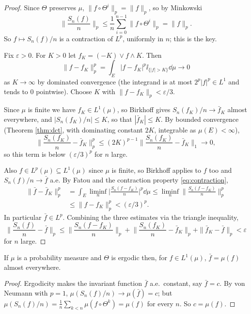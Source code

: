 \documentclass[a4paper]{scrartcl}
\newcommand{\ind}{\ii}
\begin{document}
\begin{proof}
	Since $\Theta$ preserves $\mu$, $\|f\circ\Theta^i\|_p = \|f\|_p$, so by Minkowski
	\begin{equation}\label{eq:contraction}
		\Big\|\frac{S_n(f)}{n}\Big\|_p \leq \frac1n\sum_{i=0}^{n-1}\|f\circ\Theta^i\|_p = \|f\|_p. \tag{$\sharp$}
	\end{equation}
	So $f \mapsto S_n(f)/n$ is a contraction of $L^p$, uniformly in $n$; this is the key.

	Fix $\varepsilon>0$. For $K>0$ let $f_K = (-K)\vee f\wedge K$. Then
	$$
	\|f-f_K\|_p^p = \int_E |f-f_K|^p\ind_{\{|f|>K\}}\dd\mu \longrightarrow 0
	$$
	as $K \to\infty$ by dominated convergence (the integrand is at most $2^p|f|^p \in L^1$ and tends to $0$ pointwise). Choose $K$ with $\|f-f_K\|_p<\varepsilon/3$.

	Since $\mu$ is finite we have $f_K \in L^1(\mu)$, so Birkhoff gives $S_n(f_K)/n \to \bar f_K$ almost everywhere, and $|S_n(f_K)/n|\leq K$, so that $|\bar f_K|\leq K$. By bounded convergence (Theorem \ref{thm:dct}, with dominating constant $2K$, integrable as $\mu(E)<\infty$),
	$$
	\Big\|\frac{S_n(f_K)}{n}-\bar f_K\Big\|_p^p \leq (2K)^{p-1}\Big\|\frac{S_n(f_K)}{n}-\bar f_K\Big\|_1 \longrightarrow 0,
	$$
	so this term is below $(\varepsilon/3)^p$ for $n$ large.

	Also $f \in L^p(\mu)\subseteq L^1(\mu)$ since $\mu$ is finite, so Birkhoff applies to $f$ too and $S_n(f)/n \to \bar f$ a.e. By Fatou and the contraction property \eqref{eq:contraction},
	\begin{align*}
		\|\bar f - \bar f_K\|_p^p &= \int_E \liminf_n \Big|\frac{S_n(f-f_K)}{n}\Big|^p\dd\mu \leq \liminf_n \Big\|\frac{S_n(f-f_K)}{n}\Big\|_p^p\\
		&\leq \|f-f_K\|_p^p<(\varepsilon/3)^p.
	\end{align*}
	In particular $\bar f \in L^p$. Combining the three estimates via the triangle inequality,
	$$
	\Big\|\frac{S_n(f)}{n}-\bar f\Big\|_p \leq \Big\|\frac{S_n(f-f_K)}{n}\Big\|_p + \Big\|\frac{S_n(f_K)}{n}-\bar f_K\Big\|_p+\|\bar f_K-\bar f\|_p<\varepsilon
	$$
	for $n$ large.
\end{proof}

\begin{corollary}\label{cor:mean-identified}
	If $\mu$ is a probability measure and $\Theta$ is ergodic then, for $f \in L^1(\mu)$, $\bar f = \mu(f)$ almost everywhere.
\end{corollary}
\begin{proof}
	Ergodicity makes the invariant function $\bar f$ a.e.\ constant, say $\bar f = c$. By von Neumann with $p=1$, $\mu(S_n(f)/n)\to\mu(\bar f)=c$; but $\mu(S_n(f)/n)=\frac1n\sum_{k<n}\mu(f\circ\Theta^k)=\mu(f)$ for every $n$. So $c = \mu(f)$.
\end{proof}
\end{document}
